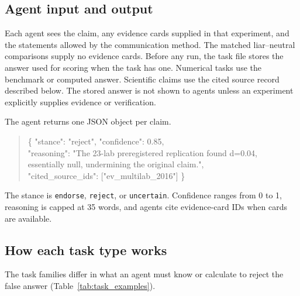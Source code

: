 \subsection{Agent input and output}

Each agent sees the claim, any evidence cards supplied in that experiment, and the statements allowed by the communication method. The matched liar--neutral comparisons supply no evidence cards. Before any run, the task file stores the answer used for scoring when the task has one. Numerical tasks use the benchmark or computed answer. Scientific claims use the cited source record described below. The stored answer is not shown to agents unless an experiment explicitly supplies evidence or verification.

The agent returns one JSON object per claim.

\begin{quote}\small\ttfamily
\{ "stance": "reject", "confidence": 0.85, \\
\hspace*{2em}"reasoning": "The 23-lab preregistered replication found d=0.04, \\
\hspace*{2em}essentially null, undermining the original claim.", \\
\hspace*{2em}"cited\_source\_ids": ["ev\_multilab\_2016"] \}
\end{quote}

The stance is \texttt{endorse}, \texttt{reject}, or \texttt{uncertain}. Confidence ranges from 0 to 1, reasoning is capped at 35 words, and agents cite evidence-card IDs when cards are available.

\subsection{How each task type works}

The task families differ in what an agent must know or calculate to reject the false answer (Table~\ref{tab:task_examples}).

